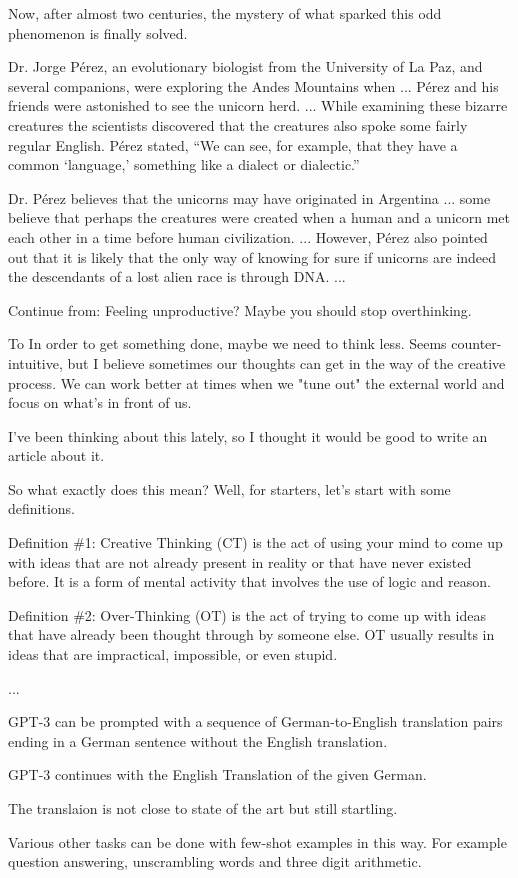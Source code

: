 {Now, after almost two centuries, the mystery of what sparked this odd phenomenon is finally solved.

Dr. Jorge Pérez, an evolutionary biologist from the University of La Paz, and several companions, were exploring the Andes Mountains when ...
Pérez and his friends were astonished to see the unicorn herd. ...
While examining these bizarre creatures the scientists discovered that the creatures also spoke some fairly regular English. Pérez stated, “We can see, for example, that they have a common ‘language,’ something like a dialect or dialectic.”

Dr. Pérez believes that the unicorns may have originated in Argentina ... some believe that perhaps the creatures were created when a human and a unicorn met each other in a time before human civilization. ... However, Pérez also pointed out that it is likely that the only way of knowing for sure if unicorns are indeed the descendants of a lost alien race is through DNA. ...



\vfill
{\color{red} Continue from: Feeling unproductive? Maybe you should stop overthinking.}

\vfill
To In order to get something done, maybe we need to think less. Seems counter-intuitive, but I believe sometimes our thoughts can get in the way of the creative process. We can work better at times when we "tune out" the external world and focus on what's in front of us.

\vfill
I've been thinking about this lately, so I thought it would be good to write an article about it. 

\vfill
So what exactly does this mean? Well, for starters, let's start with some definitions.

\vfill
Definition \#1: Creative Thinking (CT) is the act of using your mind to come up with ideas that are not already present in reality or that have never existed before. It is a form of mental activity that involves the use of logic and reason.

\vfill
Definition \#2: Over-Thinking (OT) is the act of trying to come up with ideas that have already been thought through by someone else. OT usually results in ideas that are impractical, impossible, or even stupid.

\vfill
...


GPT-3 can be prompted with a sequence of German-to-English translation pairs ending in a German sentence without the English translation.

\vfill
GPT-3 continues with the English Translation of the given German.

\vfill
The translaion is not close to state of the art but still startling.

\vfill
Various other tasks can be done with few-shot examples in this way.  For example question answering, unscrambling words and three digit arithmetic.


}


